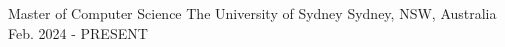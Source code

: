 

\begin{cventries}

  \cventry
    {Master of Computer Science} %
    {The University of Sydney} %
    {Sydney, NSW, Australia} %
    {Feb. 2024 - PRESENT} %
    {
      \begin{cvitems} %
      \end{cvitems}
    }

\end{cventries}
